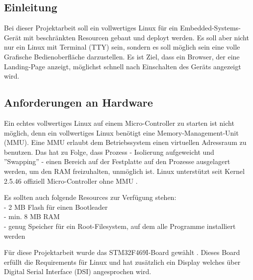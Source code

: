 
\subsection{Einleitung}
Bei dieser Projektarbeit soll ein vollwertiges Linux für ein Embedded-Systems-Gerät
mit beschränkten Resourcen gebaut und deployt werden. Es soll aber nicht nur ein
Linux mit Terminal (TTY) sein, sondern es soll möglich sein eine volle Grafische
Bedienoberfläche darzustellen. Es ist Ziel, dass ein Browser, der eine Landing-Page
anzeigt, möglichst schnell nach Einschalten des Geräts angezeigt wird.

\subsection{Anforderungen an Hardware}
Ein echtes vollwertiges Linux auf einem Micro-Controller zu starten ist nicht möglich,
denn ein vollwertiges Linux benötigt eine Memory-Management-Unit (MMU). Eine MMU
erlaubt dem Betriebssystem einen virtuellen Adressraum zu benutzen. Das hat zu Folge,
dass Prozess - Isolierung aufgeweicht und ''Swapping'' - einen Bereich auf der
Festplatte auf den Prozesse ausgelagert werden, um den RAM freizuhalten,
unmöglich ist. Linux unterstützt seit Kernel 2.5.46 offiziell Micro-Controller ohne
MMU \cite{uCLinuxWikipedia}.

Es sollten auch folgende Resources zur Verfügung stehen:
\\ - 2 MB Flash für einen Bootleader
\\ - min. 8 MB RAM
\\ - genug Speicher für ein Root-Filesystem, auf dem alle Programme installiert werden

Für diese Projektarbeit wurde das STM32F469I-Board gewählt \cite{stmWebsiteBoard}.
Dieses Board erfüllt die Requirements für Linux und hat zusätzlich ein Display welches
über Digital Serial Interface (DSI) angesprochen wird.
